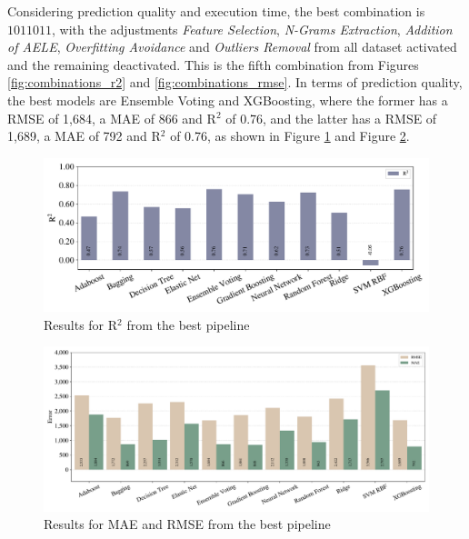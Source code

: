 Considering prediction quality and execution time, the best combination is $1011011$, with the adjustments \textit{Feature Selection}, \textit{N-Grams Extraction}, \textit{Addition of \gls{AELE}}, \textit{Overfitting Avoidance} and \textit{Outliers Removal} from all dataset activated and the remaining deactivated. This is the fifth combination from Figures \ref{fig:combinations_r2} and \ref{fig:combinations_rmse}. In terms of prediction quality, the best models are Ensemble Voting and XGBoosting, where the former has a \gls{RMSE} of 1,684, a \gls{MAE} of 866 and R$^2$ of 0.76, and the latter has a \gls{RMSE} of 1,689, a \gls{MAE} of 792 and R$^2$ of 0.76, as shown in Figure \ref{fig:results_best_pipeline_r2} and Figure \ref{fig:results_best_pipeline_error}.

\begin{figure}[!htb]
  \centering
  \caption{Results for R$^2$ from the best pipeline}
  \label{fig:results_best_pipeline_r2}
  \includegraphics[width=\textwidth]{images/chapters/results_regression_best_r2.pdf}
\end{figure}

\begin{figure}[!htb]
  \centering
  \caption{Results for MAE and RMSE from the best pipeline}
  \label{fig:results_best_pipeline_error}
  \includegraphics[width=\textwidth]{images/chapters/results_regression_best_mae_rmse.pdf}
\end{figure}


